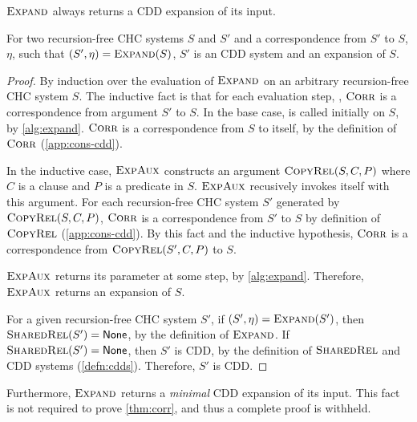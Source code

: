 $\textsc{Expand}$ always returns a CDD expansion of its input.
%
\begin{lem}
  \label{lem:expand-corr}
  For two recursion-free CHC systems $S$ and $S'$ and a correspondence
  from $S'$ to $S$, $\eta$, such that $(S', \eta) = \textsc{Expand}(S)$,
  $S'$ is an CDD system and an expansion of $S$.
\end{lem}
%
\begin{proof}
  By induction over the evaluation of $\textsc{Expand}$ on
  an arbitrary recursion-free CHC system $S$.
  The inductive fact is that for each evaluation step, \expandaux,
  $\textsc{Corr}$ is a correspondence from argument
  $S'$ to $S$.
  In the base case, \expandaux is called initially on $S$,
  by \autoref{alg:expand}.
  $\textsc{Corr}$ is a correspondence from $S$ to itself, by the definition of
  $\textsc{Corr}$
  (\autoref{app:cons-cdd}).

  In the inductive case,
  $\textsc{ExpAux}$ constructs an argument
  $\textsc{CopyRel}(S, C, P)$
  where $C$ is a clause and $P$ is a predicate in $S$.
  $\textsc{ExpAux}$ recusively invokes itself with this argument.
  For each recursion-free CHC system $S'$ generated by $\textsc{CopyRel}(S, C, P)$,
  $\textsc{Corr}$ is a correspondence from $S'$ to
  $S$ by definition of $\textsc{CopyRel}$
  (\autoref{app:cons-cdd}).
  By this fact and the inductive hypothesis, $\textsc{Corr}$ is
  a correspondence from $\textsc{CopyRel}(S',
  C, P)$ to $S$.

  $\textsc{ExpAux}$ returns its parameter at some step, by
  \autoref{alg:expand}.
  Therefore, $\textsc{ExpAux}$ returns an expansion of $S$.

  For a given recursion-free CHC system $S'$, if $(S', \eta) =
  \textsc{Expand}(S')$,
  then $\textsc{SharedRel}(S') = \mathsf{None}$, by the definition of $\textsc{Expand}$.
  If $\textsc{SharedRel}(S') = \mathsf{None}$, then $S'$ is
  CDD, by the definition of $\textsc{SharedRel}$ and CDD systems
  (\autoref{defn:cdds}).
  Therefore, $S'$ is CDD.
\end{proof}
%
Furthermore, $\textsc{Expand}$ returns a \emph{minimal} CDD
expansion of its input.
%
This fact is not required to prove \autoref{thm:corr}, and thus a
complete proof is withheld.

